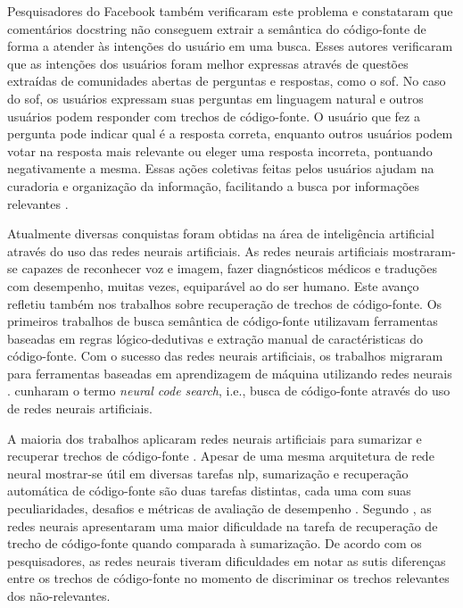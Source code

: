 Pesquisadores do Facebook \citep{cambronero-deep-learning-code-search:2019} também verificaram este problema e constataram que comentários \gls{docstring} não conseguem extrair a semântica do código-fonte de forma a atender às intenções do usuário em uma busca. Esses autores verificaram que as intenções dos usuários foram melhor expressas através de questões extraídas de comunidades abertas de perguntas e respostas, como o \gls{sof}. No caso do \Gls{sof}, os usuários expressam suas perguntas em linguagem natural e outros usuários podem responder com trechos de código-fonte. O usuário que fez a pergunta pode indicar qual é a resposta correta, enquanto outros usuários podem votar na resposta mais relevante ou eleger uma resposta incorreta, pontuando negativamente a mesma. Essas ações coletivas feitas pelos usuários ajudam na curadoria e organização da informação, facilitando a busca por informações relevantes \citep{Wang-quora:2013, cambronero-deep-learning-code-search:2019}. 

Atualmente diversas conquistas foram obtidas na área de inteligência artificial através do uso das redes neurais artificiais. As redes neurais artificiais mostraram-se capazes de reconhecer voz e imagem, fazer diagnósticos médicos e traduções com desempenho, muitas vezes, equiparável ao do ser humano. Este avanço refletiu também nos trabalhos sobre recuperação de trechos de código-fonte. Os primeiros trabalhos de busca semântica de código-fonte utilizavam ferramentas baseadas em regras lógico-dedutivas e extração manual de caractéristicas do código-fonte. Com o sucesso das redes neurais artificiais, os trabalhos migraram para ferramentas baseadas em aprendizagem de máquina utilizando redes neurais \citep{Gu-deep-code-search:2018, yao-2018, iyer-etal-2016-summarizing, Allamanis-bimodal-source-code-natural-language:2015, Chen-bi-variational-autoencoder:2018, Sachdev-neural-code-search:2018, cambronero-deep-learning-code-search:2019}. \cite{cambronero-deep-learning-code-search:2019} cunharam o termo \textit{neural code search}, i.e., busca de código-fonte através do uso de redes neurais artificiais.


A maioria dos trabalhos aplicaram redes neurais artificiais para sumarizar e recuperar trechos de código-fonte \citep{iyer-etal-2016-summarizing, Allamanis-bimodal-source-code-natural-language:2015, Chen-bi-variational-autoencoder:2018}. Apesar de uma mesma arquitetura de rede neural mostrar-se 
útil em diversas tarefas \acrshort{nlp}, sumarização e recuperação automática de código-fonte são duas tarefas distintas, cada uma com suas peculiaridades, desafios e métricas de avaliação de desempenho \citep{allahyari-text-summarization-2017}. Segundo \cite{Allamanis-bimodal-source-code-natural-language:2015}, as redes neurais apresentaram uma maior dificuldade na tarefa de recuperação de trecho de código-fonte quando comparada à sumarização. De acordo com os pesquisadores, as redes neurais tiveram dificuldades em notar as sutis diferenças entre os trechos de código-fonte no momento de discriminar os trechos relevantes dos não-relevantes. 

